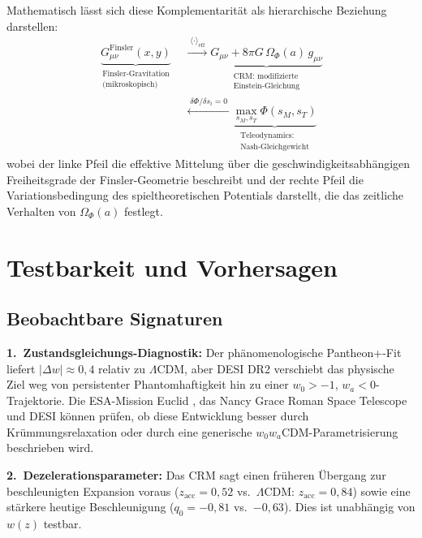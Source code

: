 \documentclass[aps,prd,twocolumn,superscriptaddress,nofootinbib]{revtex4-2}
\begin{document}
Mathematisch l\"asst sich diese Komplementarit\"at als hierarchische Beziehung darstellen:
\begin{equation}
\begin{split}
\underbrace{G_{\mu\nu}^{\mathrm{Finsler}}(x, y)}_{\substack{\text{Finsler-Gravitation}\\\text{(mikroskopisch)}}}
&\;\xrightarrow{\;\langle\cdot\rangle_{\mathrm{eff}}\;}
\underbrace{G_{\mu\nu} + 8\pi G\,\Omega_\Phi(a)\,g_{\mu\nu}}_{\substack{\text{CRM: modifizierte}\\\text{Einstein-Gleichung}}} \\
&\;\xleftarrow{\;\delta\Phi/\delta s_i = 0\;}
\underbrace{\max_{s_M, s_T} \Phi(s_M, s_T)}_{\substack{\text{Teleodynamics:}\\\text{Nash-Gleichgewicht}}}
\end{split}
\label{eq:complementarity}
\end{equation}
wobei der linke Pfeil die effektive Mittelung \"uber die geschwindigkeitsabh\"angigen Freiheitsgrade der Finsler-Geometrie beschreibt und der rechte Pfeil die Variationsbedingung des spieltheoretischen Potentials darstellt, die das zeitliche Verhalten von $\Omega_\Phi(a)$ festlegt.

\section{Testbarkeit und Vorhersagen}
\label{sec:testbarkeit}

\subsection{Beobachtbare Signaturen}

\textbf{1.~Zustandsgleichungs-Diagnostik:} Der phänomenologische Pantheon+-Fit liefert $|\Delta w| \approx 0{,}4$ relativ zu $\Lambda$CDM, aber DESI DR2 verschiebt das physische Ziel weg von persistenter Phantomhaftigkeit hin zu einer $w_0>-1$, $w_a<0$-Trajektorie. Die ESA-Mission Euclid \cite{Euclid2024}, das Nancy Grace Roman Space Telescope und DESI können prüfen, ob diese Entwicklung besser durch Krümmungsrelaxation oder durch eine generische $w_0w_a$CDM-Parametrisierung beschrieben wird.

\textbf{2.~Dezelerationsparameter:} Das CRM sagt einen fr\"uheren \"Ubergang zur beschleunigten Expansion voraus ($z_{\mathrm{acc}} = 0{,}52$ vs.\ $\Lambda$CDM: $z_{\mathrm{acc}} = 0{,}84$) sowie eine st\"arkere heutige Beschleunigung ($q_0 = -0{,}81$ vs.\ $-0{,}63$). Dies ist unabh\"angig von $w(z)$ testbar.
\end{document}
